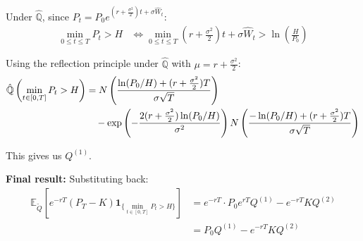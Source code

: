 \documentclass{article}
\begin{document}
Under $\hat{\mathbb{Q}}$, since $P_t = P_0 e^{(r + \frac{\sigma^2}{2})t + \sigma\hat{W}_t}$:
\begin{align}
\min_{0 \leq t \leq T} P_t > H &\Leftrightarrow \min_{0 \leq t \leq T} \left(r + \frac{\sigma^2}{2}\right)t + \sigma\hat{W}_t > \ln\left(\frac{H}{P_0}\right)
\end{align}

Using the reflection principle under $\hat{\mathbb{Q}}$ with $\mu = r + \frac{\sigma^2}{2}$:
\begin{align}
\hat{\mathbb{Q}}\left(\min_{t \in [0,T]} P_t > H\right) &= N\left(\frac{\ln(P_0/H) + (r + \frac{\sigma^2}{2})T}{\sigma\sqrt{T}}\right) \notag\\
&\quad - \exp\left(-\frac{2(r + \frac{\sigma^2}{2})\ln(P_0/H)}{\sigma^2}\right) N\left(\frac{-\ln(P_0/H) + (r + \frac{\sigma^2}{2})T}{\sigma\sqrt{T}}\right)
\end{align}

This gives us $Q^{(1)}$.

\textbf{Final result:}
Substituting back:
\begin{align}
\mathbb{E}_{\tilde{Q}}\left[e^{-rT}(P_T - K)\mathbf{1}_{\{\min_{t \in [0,T]} P_t > H\}}\right] &= e^{-rT} \cdot P_0 e^{rT} Q^{(1)} - e^{-rT}K Q^{(2)}\\
&= P_0 Q^{(1)} - e^{-rT}K Q^{(2)}
\end{align}
\end{document}
